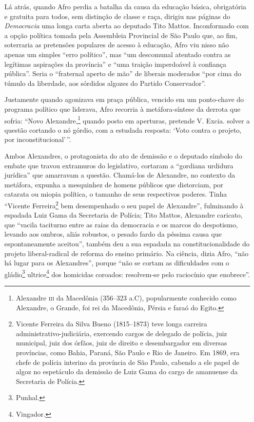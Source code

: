 Lá atrás, quando Afro perdia a batalha da causa da educação
básica, obrigatória e gratuita para todos, sem distinção de classe e
raça, dirigiu nas páginas do \emph{Democracia} uma longa carta aberta ao
deputado Tito Mattos. Inconformado com a opção política tomada pela
Assembleia Provincial de São Paulo que, ao fim, soterraria as pretensões
populares de acesso à educação, Afro viu nisso não apenas um
simples ``erro político'', mas ``um descomunal atentado contra as legítimas
aspirações da província'' e ``uma traição imperdoável à confiança
pública''. Seria o ``fraternal aperto de mão'' de liberais moderados ``por
cima do túmulo da liberdade, aos sórdidos algozes do Partido
Conservador''.

Justamente quando agonizava em praça pública, vencido em um ponto-chave
do programa político que liderava, Afro recorria à
metáfora-síntese da derrota que sofria: ``Novo Alexandre,\footnote{Alexandre \textsc{iii} da Macedônia (356--323 a.C), popularmente conhecido como
  Alexandre, o Grande, foi rei da Macedônia, Pérsia e faraó do Egito.}
quando posto em aperturas, pretende V. Excia. solver a questão cortando
o nó górdio, com a estudada resposta:
`Voto contra o projeto, por inconstitucional'\,''.

Ambos Alexandres, o protagonista do ato de demissão e o deputado
símbolo do embate que travou extramuros do legislativo, cortaram a
``gordiana urdidura jurídica'' que amarravam a questão. Chamá-los de
Alexandre, no contexto da metáfora, expunha a mesquinhez de
homens públicos que distorciam, por catarata ou miopia política, o
tamanho de seus respectivos poderes. Tinha ``Vicente Ferreira\footnote{Vicente Ferreira da Silva Bueno (1815--1873) teve longa carreira
  administrativo-judiciária, exercendo cargos de delegado de polícia,
  juiz municipal, juiz dos órfãos, juiz de direito e desembargador em
  diversas províncias, como Bahia, Paraná, São Paulo e Rio de Janeiro.
  Em 1869, era chefe de polícia interino da província de São Paulo,
  cabendo a ele papel de algoz no espetáculo da demissão de Luiz Gama do
  cargo de amanuense da Secretaria de Polícia.} bem desempenhado o seu
papel de Alexandre'', fulminando à espadada Luiz Gama da Secretaria de
Polícia; Tito Mattos, Alexandre caricato, que ``vacila taciturno entre as
raias da democracia e os marcos do despotismo, levando aos ombros, aliás
robustos, o pesado fardo da péssima causa que espontaneamente aceitou'',
também deu a sua espadada na constitucionalidade do projeto
liberal-radical de reforma do ensino primário. Na ciência, dizia
Afro, ``não há lugar para os Alexandres'', porque ``não se cortam as
dificuldades com o gládio\footnote{Punhal.} ultrice\footnote{Vingador.} dos homicidas coroados: resolvem-se pelo raciocínio que
enobrece''.

